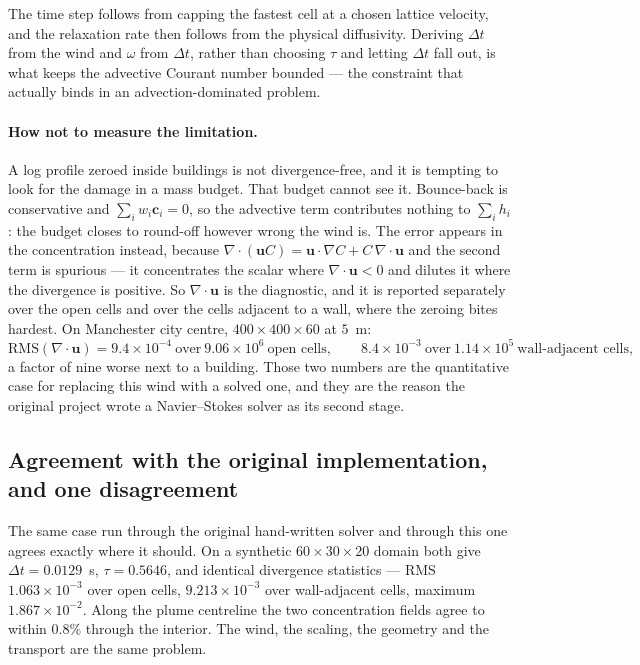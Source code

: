 \documentclass[11pt,a4paper]{article}
\newcommand{\ci}{\bm{c}_i}
\newcommand{\uu}{\bm{u}}
\begin{document}
The time step follows from capping the fastest cell at a chosen lattice
velocity, and the relaxation rate then follows from the physical diffusivity.
Deriving $\Delta t$ from the wind and $\omega$ from $\Delta t$, rather than
choosing $\tau$ and letting $\Delta t$ fall out, is what keeps the advective
Courant number bounded --- the constraint that actually binds in an
advection-dominated problem.

\paragraph{How not to measure the limitation.} A log profile zeroed inside
buildings is not divergence-free, and it is tempting to look for the damage in a
mass budget. That budget cannot see it. Bounce-back is conservative and
$\sum_i w_i \ci = 0$, so the advective term contributes nothing to
$\sum_i h_i$: the budget closes to round-off however wrong the wind is. The
error appears in the concentration instead, because
$\nabla\!\cdot\!(\uu C) = \uu\!\cdot\!\nabla C + C\,\nabla\!\cdot\!\uu$
and the second term is spurious --- it concentrates the scalar where
$\nabla\!\cdot\!\uu < 0$ and dilutes it where the divergence is positive. So
$\nabla\!\cdot\!\uu$ is the diagnostic, and it is reported separately over
the open cells and over the cells adjacent to a wall, where the zeroing bites
hardest. On Manchester city centre, $400\times400\times60$ at $5$~m:
\[
  \mathrm{RMS}(\nabla\!\cdot\!\uu) = 9.4\times10^{-4}
  \ \text{over}\ 9.06\times10^{6}\ \text{open cells},
  \qquad
  8.4\times10^{-3}\ \text{over}\ 1.14\times10^{5}\ \text{wall-adjacent cells},
\]
a factor of nine worse next to a building. Those two numbers are the
quantitative case for replacing this wind with a solved one, and they are the
reason the original project wrote a Navier--Stokes solver as its second stage.

\subsection{Agreement with the original implementation, and one disagreement}
\label{sec:urbancompare}

The same case run through the original hand-written solver and through this one
agrees exactly where it should. On a synthetic $60\times30\times20$ domain both
give $\Delta t = 0.0129$~s, $\tau = 0.5646$, and identical divergence
statistics --- RMS $1.063\times10^{-3}$ over open cells, $9.213\times10^{-3}$
over wall-adjacent cells, maximum $1.867\times10^{-2}$. Along the plume
centreline the two concentration fields agree to within $0.8\%$ through the
interior. The wind, the scaling, the geometry and the transport are the same
problem.
\end{document}

